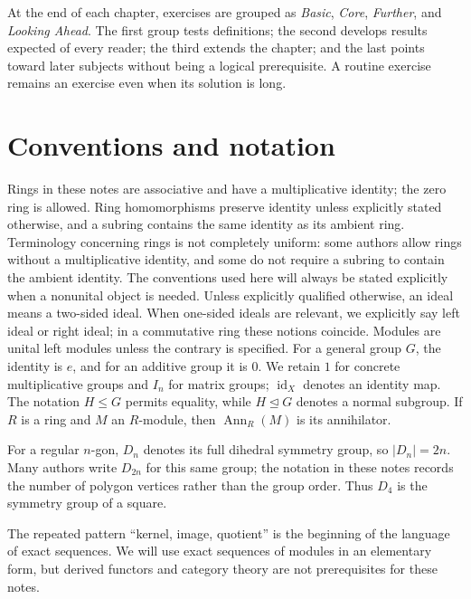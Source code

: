 At the end of each chapter, exercises are grouped as \emph{Basic},
\emph{Core}, \emph{Further}, and \emph{Looking Ahead}.  The first group tests
definitions; the second develops results expected of every reader; the third
extends the chapter; and the last points toward later subjects without being a
logical prerequisite.  A routine exercise remains an exercise even when its
solution is long.

\section{Conventions and notation}

Rings in these notes are associative and have a multiplicative identity; the
zero ring is allowed.  Ring homomorphisms preserve identity unless explicitly
stated otherwise, and a subring contains the same identity as its ambient
ring.  Terminology concerning rings is not completely uniform: some authors
allow rings without a multiplicative identity, and some do not require a
subring to contain the ambient identity.  The conventions used here will
always be stated explicitly when a nonunital object is needed.  Unless
explicitly qualified otherwise, an ideal means a two-sided ideal.  When
one-sided ideals are relevant, we explicitly say left ideal or right ideal;
in a commutative ring these notions coincide.
Modules are unital left modules unless the contrary is specified. For a general
group \(G\), the identity is \(e\), and for an additive group it is \(0\).
We retain \(1\) for concrete multiplicative groups and \(I_n\) for matrix
groups; \(\operatorname{id}_X\) denotes an identity map. The
notation \(H\leq G\) permits equality, while \(H\trianglelefteq G\) denotes a
normal subgroup.  If \(R\) is a ring and \(M\) an \(R\)-module, then
\(\operatorname{Ann}_R(M)\) is its annihilator.

For a regular \(n\)-gon, \(D_n\) denotes its full dihedral symmetry group, so
\(|D_n|=2n\).  Many authors write \(D_{2n}\) for this same group; the notation
in these notes records the number of polygon vertices rather than the group
order.  Thus \(D_4\) is the symmetry group of a square.

\begin{remark}
The repeated pattern ``kernel, image, quotient'' is the beginning of the
language of exact sequences.  We will use exact sequences of modules in an
elementary form, but derived functors and category theory are not prerequisites
for these notes.
\end{remark}

